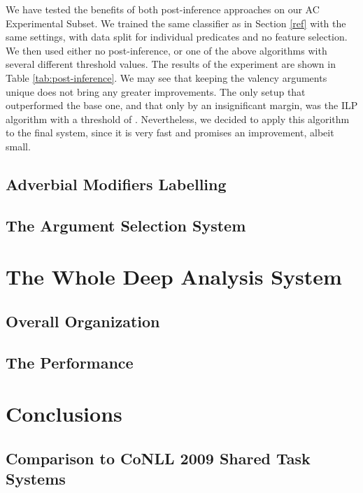 \documentclass[12pt,notitlepage]{report}
\begin{document}
We have tested the benefits of both post-inference approaches on our AC Experimental Subset. We trained the same classifier as in Section \ref{ref} with the same settings, with data split for individual predicates and no feature selection. We then used either no post-inference, or one of the above algorithms with several different threshold values. The results of the experiment are shown in Table \ref{tab:post-inference}. We may see that keeping the valency arguments unique does not bring any greater improvements. The only setup that outperformed the base one, and that only by an insignificant margin, was the ILP algorithm with a threshold of . Nevertheless, we decided to apply this algorithm to the final system, since it is very fast and promises an improvement, albeit small.

\section{Adverbial Modifiers Labelling}\label{ac-am}
\section{The Argument Selection System}\label{ac-overview}

\chapter{The Whole Deep Analysis System}\label{setup}
\section{Overall Organization}
\section{The Performance}

\chapter{Conclusions}\label{conclusions}
\section{Comparison to CoNLL 2009 Shared Task Systems}
\end{document}
